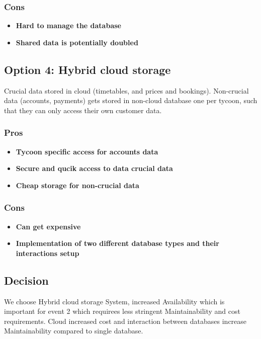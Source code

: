 \subsubsection*{Cons}
\begin{itemize}[noitemsep]
    \item \textbf{Hard to manage the database} 
    \item \textbf{Shared data is potentially doubled} 
\end{itemize}

\subsection*{Option 4: Hybrid cloud storage}
Crucial data stored in cloud (timetables, and prices and bookings). Non-crucial data (accounts, payments) gets stored in non-cloud database one per tycoon, such that they can only access their own customer data.

\subsubsection*{Pros}
\begin{itemize}[noitemsep]
    \item \textbf{Tycoon specific access for accounts data} 
    \item \textbf{Secure and qucik access to data crucial data} 
    \item \textbf{Cheap storage for non-crucial data} 
\end{itemize}

\subsubsection*{Cons}
\begin{itemize}[noitemsep]
    \item \textbf{Can get expensive} 
    \item \textbf{Implementation of two different database types and their interactions setup}
\end{itemize}

\subsection*{Decision}
We choose Hybrid cloud storage System, increased Availability which is important for event 2 which requirees less stringent Maintainability and cost requirements. Cloud increased cost and interaction between databases increase Maintainability compared to single database.
